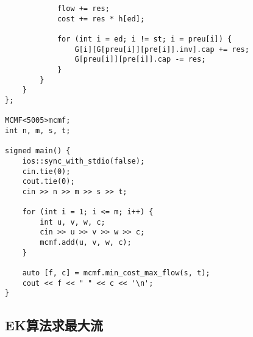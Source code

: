 \begin{verbatim}
            flow += res;
            cost += res * h[ed];

            for (int i = ed; i != st; i = preu[i]) {
                G[i][G[preu[i]][pre[i]].inv].cap += res;
                G[preu[i]][pre[i]].cap -= res;
            }
        }
    }
};

MCMF<5005>mcmf;
int n, m, s, t;

signed main() {
    ios::sync_with_stdio(false);
    cin.tie(0);
    cout.tie(0);
    cin >> n >> m >> s >> t;

    for (int i = 1; i <= m; i++) {
        int u, v, w, c;
        cin >> u >> v >> w >> c;
        mcmf.add(u, v, w, c);
    }

    auto [f, c] = mcmf.min_cost_max_flow(s, t);
    cout << f << " " << c << '\n';
}
\end{verbatim}

\subsection{EK算法求最大流}

